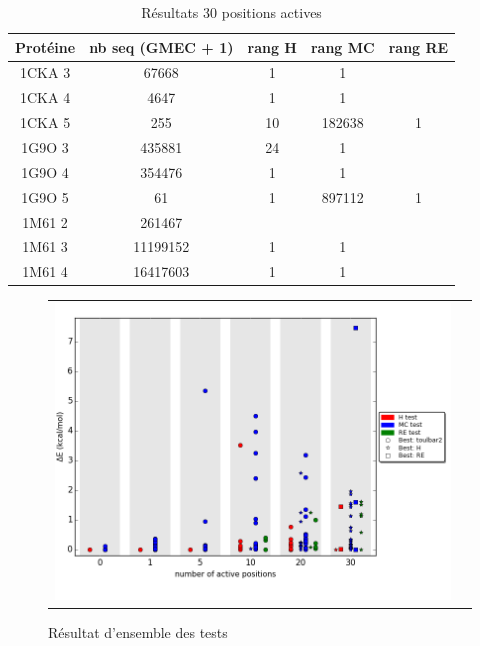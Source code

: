 \documentclass[a4paper,12pt]{article}
\begin{document}
    \begin{table}[h]
      \centering

      \begin{tabular}{|c|c|c|c|c|}

        Protéine & nb seq (GMEC + 1) & rang H &rang MC & rang RE \\
        \hline

        1CKA 3 &  67668 & 1 & 1 & \\
        1CKA 4 &  4647 & 1 & 1 & \\
        1CKA 5 &  255 &  10 & 182638 & 1 \\
        1G9O 3 &  435881 & 24 & 1 \\
        1G9O 4 &  354476 & 1 & 1 \\
        1G9O 5 &  61 & 1 & 897112 & 1 \\
        1M61 2 &  261467 &  & \\
        1M61 3 &  11199152 & 1 & 1 &\\
        1M61 4 &  16417603  & 1 & 1 & \\
        \hline


 \end{tabular}      
 \caption{Résultats 30 positions actives }
 \label{tab_echec2BYG__1}      
\end{table}


    \clearpage
    
    \begin{figure}[h]
      \centering
      \begin{tabular}{cc} 
        \includegraphics[width=15cm]{graphe/all_result.png} &
      \end{tabular}
      
      \caption{Résultat d'ensemble des tests}
      \label{temps_CPU}
    \end{figure}
    
    
    \clearpage
\end{document}
